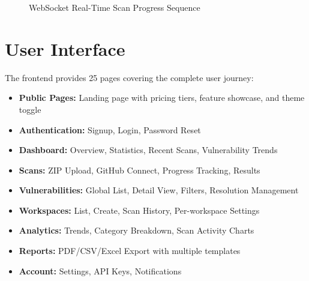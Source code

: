 \documentclass[12pt,a4paper]{report}
\begin{document}
\begin{figure}[H]
\caption{WebSocket Real-Time Scan Progress Sequence}
\label{fig:websocket_flow}
\end{figure}
\clearpage
\section{User Interface}

The frontend provides 25 pages covering the complete user journey:

\begin{itemize}
    \item \textbf{Public Pages:} Landing page with pricing tiers, feature showcase, and theme toggle
    \item \textbf{Authentication:} Signup, Login, Password Reset
    \item \textbf{Dashboard:} Overview, Statistics, Recent Scans, Vulnerability Trends
    \item \textbf{Scans:} ZIP Upload, GitHub Connect, Progress Tracking, Results
    \item \textbf{Vulnerabilities:} Global List, Detail View, Filters, Resolution Management
    \item \textbf{Workspaces:} List, Create, Scan History, Per-workspace Settings
    \item \textbf{Analytics:} Trends, Category Breakdown, Scan Activity Charts
    \item \textbf{Reports:} PDF/CSV/Excel Export with multiple templates
    \item \textbf{Account:} Settings, API Keys, Notifications
\end{itemize}

\end{document}
